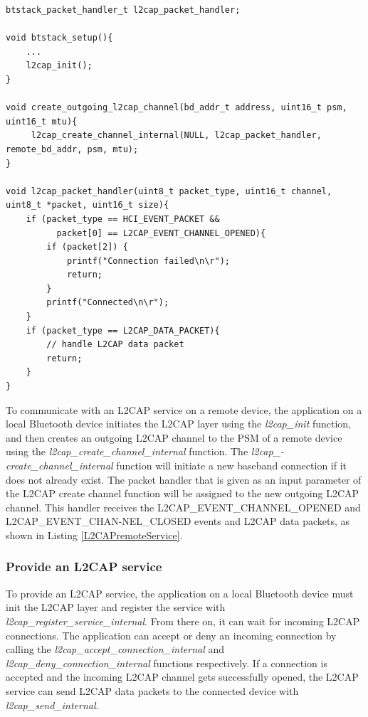 \begin{lstlisting}[caption=L2CAP handler for outgoing L2CAP channel.,label=L2CAPremoteService]
btstack_packet_handler_t l2cap_packet_handler;

void btstack_setup(){
    ...
    l2cap_init();
}

void create_outgoing_l2cap_channel(bd_addr_t address, uint16_t psm, uint16_t mtu){
     l2cap_create_channel_internal(NULL, l2cap_packet_handler, remote_bd_addr, psm, mtu);
}

void l2cap_packet_handler(uint8_t packet_type, uint16_t channel, uint8_t *packet, uint16_t size){
    if (packet_type == HCI_EVENT_PACKET &&
          packet[0] == L2CAP_EVENT_CHANNEL_OPENED){
        if (packet[2]) {
            printf("Connection failed\n\r");
            return;
        }
        printf("Connected\n\r");
    }
    if (packet_type == L2CAP_DATA_PACKET){
        // handle L2CAP data packet
        return;
    }
}
\end{lstlisting}

To communicate with an L2CAP service on a remote device, the application on a local Bluetooth device initiates the L2CAP layer using the \emph{l2cap\_init} function, and then creates an outgoing L2CAP channel to the PSM of a remote device using the \emph{l2cap\_create\_channel\_internal} function. The  \emph{l2cap\_-create\_channel\_internal} function will initiate a new baseband connection if it does not already exist. The packet handler that is given as an input parameter of the L2CAP create channel function will be assigned to the new outgoing L2CAP channel. This handler receives the L2CAP\_EVENT\_CHANNEL\_OPENED and L2CAP\_EVENT\_CHAN-NEL\_CLOSED events and L2CAP data packets, as shown in Listing \ref{L2CAPremoteService}.


\subsubsection{Provide an L2CAP service}

To provide an L2CAP service, the application on a local Bluetooth device must init the L2CAP layer and register the service with \emph{l2cap\_register\_service\_internal}. From there on, it can wait for incoming L2CAP connections. The application can accept or deny an incoming connection by calling the \emph{l2cap\_accept\_connection\_internal} and \emph{l2cap\_deny\_connection\_internal} functions respectively. If a connection is accepted and the incoming L2CAP channel gets successfully opened, the L2CAP service can send L2CAP data packets to the connected device with \emph{l2cap\_send\_internal}. 


